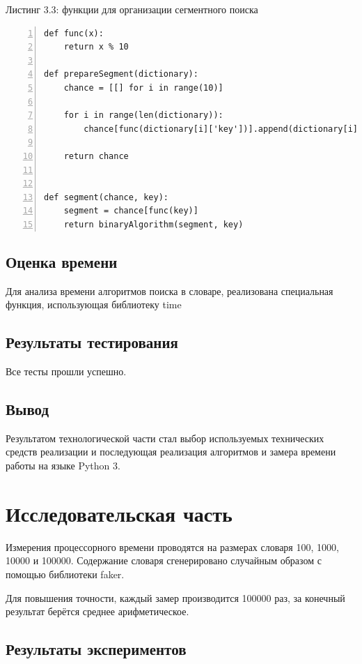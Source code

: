 \documentclass[12pt,a4paper]{report}
\begin{document}
\textrm{Листинг 3.3: функции для организации сегментного поиска}
\begin{lstlisting}[frame=single, numbers=left]
def func(x):
    return x % 10

def prepareSegment(dictionary):
    chance = [[] for i in range(10)]

    for i in range(len(dictionary)):
        chance[func(dictionary[i]['key'])].append(dictionary[i])

    return chance


def segment(chance, key):
    segment = chance[func(key)]
    return binaryAlgorithm(segment, key)
\end{lstlisting}

\section{Оценка времени}

Для анализа времени алгоритмов поиска в словаре, реализована специальная функция, использующая 
библиотеку time \cite{time_bib}

\newpage
\section{Результаты тестирования}

Все тесты прошли успешно.

\section{Вывод}

Результатом технологической части стал выбор используемых технических средств реализации 
и последующая реализация алгоритмов и замера времени работы на языке Python 3.

\newpage
\chapter{Исследовательская часть}

Измерения процессорного времени проводятся на размерах словаря 100, 1000, 10000 и 100000. 
Содержание словаря сгенерировано случайным образом с помощью библиотеки faker.

Для повышения точности, каждый замер производится 100000 раз, за конечный результат берётся 
среднее арифметическое.

\section{Результаты экспериментов}
\end{document}
